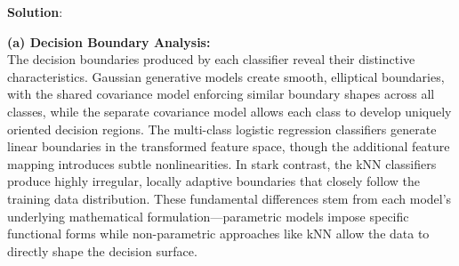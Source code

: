 \documentclass[submit]{../harvardml}
\newenvironment{solution}{
    \vspace{2mm}
    \color{blue}\noindent\textbf{Solution}:
}{}
\begin{document}
\begin{solution}
  \begin{tcolorbox}[colback=white,breakable]
  
  \textbf{(a) Decision Boundary Analysis:} \\
  The decision boundaries produced by each classifier reveal their distinctive characteristics. Gaussian generative models create smooth, elliptical boundaries, with the shared covariance model enforcing similar boundary shapes across all classes, while the separate covariance model allows each class to develop uniquely oriented decision regions. The multi-class logistic regression classifiers generate linear boundaries in the transformed feature space, though the additional feature mapping introduces subtle nonlinearities. In stark contrast, the kNN classifiers produce highly irregular, locally adaptive boundaries that closely follow the training data distribution. These fundamental differences stem from each model's underlying mathematical formulation—parametric models impose specific functional forms while non-parametric approaches like kNN allow the data to directly shape the decision surface.
  

\end{tcolorbox}
\end{solution}
\end{document}
